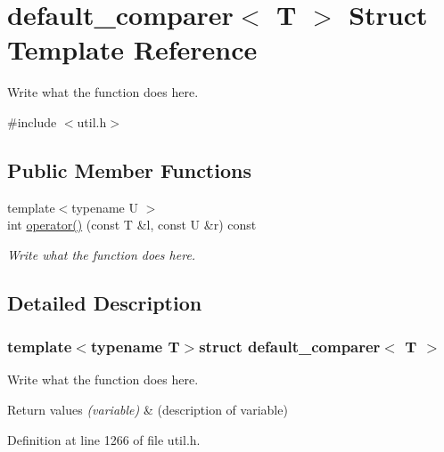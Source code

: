 \hypertarget{structdefault__comparer}{\section{default\+\_\+comparer$<$ T $>$ Struct Template Reference}
\label{structdefault__comparer}
}


Write what the function does here.  




{\ttfamily \#include $<$util.\+h$>$}

\subsection*{Public Member Functions}
\begin{DoxyCompactItemize}
\item 
{\footnotesize template$<$typename U $>$ }\\int \hyperlink{structdefault__comparer_a744d24d37aa02d789d6bd18ad90f2cac}{operator()} (const T \&l, const U \&r) const 
\begin{DoxyCompactList}\small\item\em Write what the function does here. \end{DoxyCompactList}\end{DoxyCompactItemize}


\subsection{Detailed Description}
\subsubsection*{template$<$typename T$>$struct default\+\_\+comparer$<$ T $>$}

Write what the function does here. 


\begin{DoxyRetVals}{Return values}
{\em (variable)} & (description of variable) \\
\hline
\end{DoxyRetVals}


Definition at line 1266 of file util.\+h.



